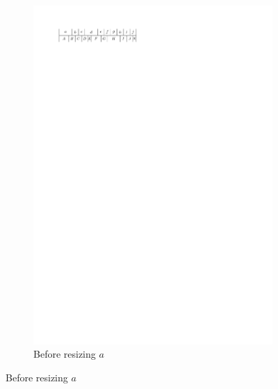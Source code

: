   \begin{figure}
    \centering
    \begin{subfigure}[b]{0.45 \textwidth}
      \centering
      \includegraphics{introduction/img/10sidedBefore.pdf}
      \caption{Before resizing $a$}
      \label{fig:intro:10sidedBefore}
    \end{subfigure}


\end{figure}
